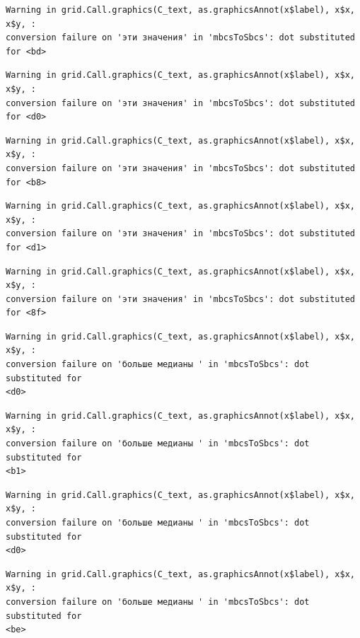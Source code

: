 \documentclass[
  letterpaper,
  DIV=11,
  numbers=noendperiod]{scrreprt}
\theoremstyle{definition}
\theoremstyle{remark}
\begin{document}
\begin{verbatim}
Warning in grid.Call.graphics(C_text, as.graphicsAnnot(x$label), x$x, x$y, :
conversion failure on 'эти значения' in 'mbcsToSbcs': dot substituted for <bd>
\end{verbatim}

\begin{verbatim}
Warning in grid.Call.graphics(C_text, as.graphicsAnnot(x$label), x$x, x$y, :
conversion failure on 'эти значения' in 'mbcsToSbcs': dot substituted for <d0>
\end{verbatim}

\begin{verbatim}
Warning in grid.Call.graphics(C_text, as.graphicsAnnot(x$label), x$x, x$y, :
conversion failure on 'эти значения' in 'mbcsToSbcs': dot substituted for <b8>
\end{verbatim}

\begin{verbatim}
Warning in grid.Call.graphics(C_text, as.graphicsAnnot(x$label), x$x, x$y, :
conversion failure on 'эти значения' in 'mbcsToSbcs': dot substituted for <d1>
\end{verbatim}

\begin{verbatim}
Warning in grid.Call.graphics(C_text, as.graphicsAnnot(x$label), x$x, x$y, :
conversion failure on 'эти значения' in 'mbcsToSbcs': dot substituted for <8f>
\end{verbatim}

\begin{verbatim}
Warning in grid.Call.graphics(C_text, as.graphicsAnnot(x$label), x$x, x$y, :
conversion failure on 'больше медианы ' in 'mbcsToSbcs': dot substituted for
<d0>
\end{verbatim}

\begin{verbatim}
Warning in grid.Call.graphics(C_text, as.graphicsAnnot(x$label), x$x, x$y, :
conversion failure on 'больше медианы ' in 'mbcsToSbcs': dot substituted for
<b1>
\end{verbatim}

\begin{verbatim}
Warning in grid.Call.graphics(C_text, as.graphicsAnnot(x$label), x$x, x$y, :
conversion failure on 'больше медианы ' in 'mbcsToSbcs': dot substituted for
<d0>
\end{verbatim}

\begin{verbatim}
Warning in grid.Call.graphics(C_text, as.graphicsAnnot(x$label), x$x, x$y, :
conversion failure on 'больше медианы ' in 'mbcsToSbcs': dot substituted for
<be>
\end{verbatim}
\end{document}
